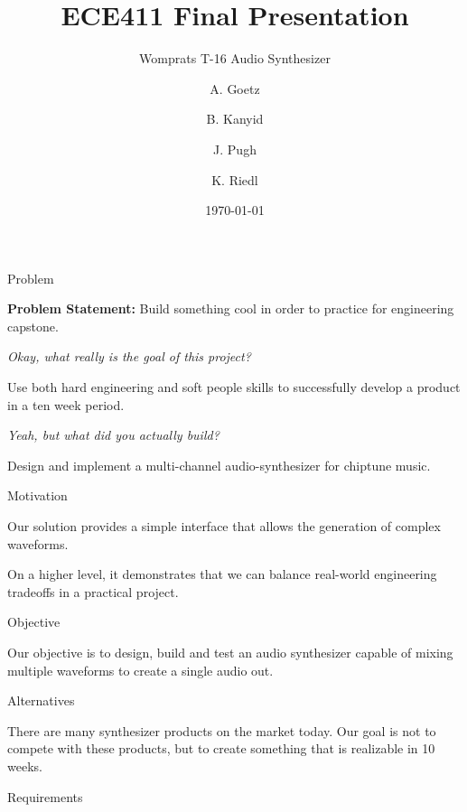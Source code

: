 \documentclass{beamer}
\title{ECE411 Final Presentation}
\subtitle{Womprats T-16 Audio Synthesizer}
\author{A. Goetz \and B. Kanyid \and J. Pugh \and K. Riedl}
\institute[PSU]{
  Maseeh College of Engineering and Computer Science\\
  Portland State University\\
  Portland, Oregon 97207  
}
\date{\today}
\begin{document}
\begin{frame}[plain]
  \titlepage
\end{frame}


\begin{frame}{Problem}

  \textbf{Problem Statement:}  \pause Build something cool in order to
  practice for engineering capstone. 

  \pause \textit{Okay, what really is the goal of this project?}

  \pause Use both hard engineering and soft people skills to
  successfully develop a product in a ten week period. 
  
  \pause \textit{Yeah, but what did you actually build?}

  \pause Design and implement a multi-channel audio-synthesizer for
  chiptune music.

  
\end{frame}

\begin{frame}{Motivation}

  Our solution provides a simple interface that allows the generation
  of complex waveforms. 

  On a higher level, it demonstrates that we can balance real-world
  engineering tradeoffs in a practical project. 

\end{frame}

\begin{frame}{Objective}

  Our objective is to design, build and test an audio synthesizer
  capable of mixing multiple waveforms to create a single audio out. 
\end{frame}

\begin{frame}{Alternatives}

There are many synthesizer products on the market today. Our goal is
not to compete with these products, but to create something that is realizable in 10 weeks. 
\end{frame}

\begin{frame}{Requirements}

\end{frame}
\end{document}
